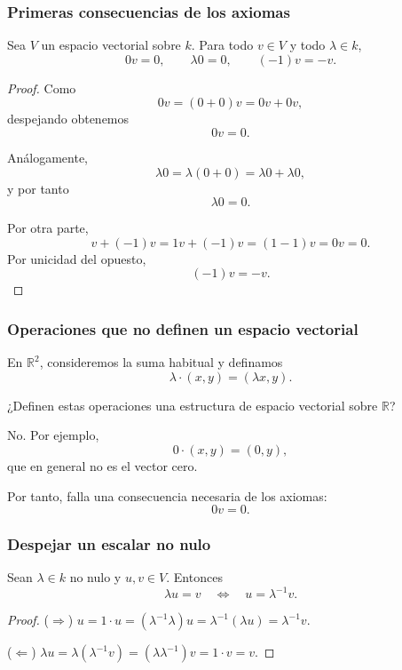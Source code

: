 \begin{frame}[allowframebreaks, t]
    \frametitle{Primeras consecuencias de los axiomas}

    \begin{proposition}
        Sea \(V\) un espacio vectorial sobre \(k\). Para todo \(v\in V\)
        y todo \(\lambda\in k\),
        \[
            0v=0,
            \qquad
            \lambda 0=0,
            \qquad
            (-1)v=-v.
        \]
    \end{proposition}

    \begin{proof}
        Como
        \[
            0v=(0+0)v=0v+0v,
        \]
        despejando obtenemos
        \[
            0v=0.
        \]

        Análogamente,
        \[
            \lambda 0
            =
            \lambda(0+0)
            =
            \lambda 0+\lambda 0,
        \]
        y por tanto
        \[
            \lambda 0=0.
        \]

        Por otra parte,
        \[
            v+(-1)v
            =
            1v+(-1)v
            =
            (1-1)v
            =
            0v
            =
            0.
        \]
        Por unicidad del opuesto,
        \[
            (-1)v=-v.
        \]
    \end{proof}
\end{frame}


\begin{frame}
    \frametitle{Operaciones que no definen un espacio vectorial}

    En \(\mathbb{R}^2\), consideremos la suma habitual y definamos
    \[
        \lambda\cdot(x,y)=(\lambda x,y).
    \]

    \medskip

    ¿Definen estas operaciones una estructura de espacio vectorial sobre \(\mathbb{R}\)?

    \medskip

    No. Por ejemplo,
    \[
        0\cdot(x,y)=(0,y),
    \]
    que en general no es el vector cero.

    \medskip

    Por tanto, falla una consecuencia necesaria de los axiomas:
    \[
        0v=0.
    \]
\end{frame}

\begin{frame}
    \frametitle{Despejar un escalar no nulo}

    \begin{proposition}
        Sean $\lambda\in k$ no nulo y $u,v\in V$. Entonces
        \[
            \lambda u=v \quad\Longleftrightarrow\quad u=\lambda^{-1}v.
        \]
    \end{proposition}

    \begin{proof}
        ($\Rightarrow$) $u=1\cdot u=(\lambda^{-1}\lambda)u=\lambda^{-1}(\lambda u)=\lambda^{-1}v$.

        ($\Leftarrow$) $\lambda u=\lambda(\lambda^{-1}v)=(\lambda\lambda^{-1})v=1\cdot v=v$.
    \end{proof}
\end{frame}


